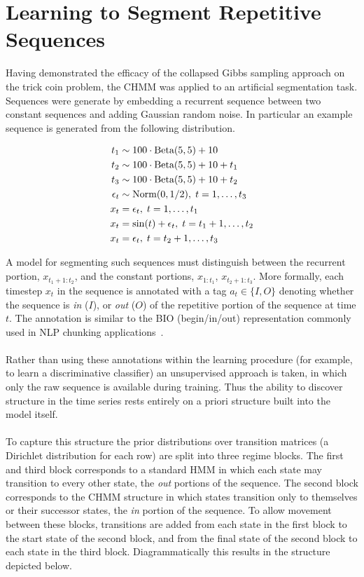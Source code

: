 \documentclass[12pt]{report}
\newcommand{\1}[0]{\mathbbm{1}}
\newcommand{\Beta}[0]{\textnormal{Beta}}
\newcommand{\Norm}[0]{\textnormal{Norm}}
\newcommand{\seq}[3]{\ensuremath{#1_{{#2}:{#3}}}}
\begin{document}
\section{Learning to Segment Repetitive Sequences}
\label{sec:Learning to Segment Repetitive Sequences}
Having demonstrated the efficacy of the collapsed Gibbs sampling approach
on the trick coin problem, the \ac{CHMM} was applied to an artificial
segmentation task.
Sequences were generate by embedding a recurrent sequence between two
constant sequences and adding Gaussian random noise.
In particular an example sequence is generated from the following distribution.

\begin{align*}
    t_1 & \sim 100 \cdot \Beta(5, 5) + 10 \\
    t_2 & \sim 100 \cdot \Beta(5, 5) + 10 + t_1 \\
    t_3 & \sim 100 \cdot \Beta(5, 5) + 10 + t_2 \\
    \epsilon_t & \sim \Norm(0, 1/2),\; t = 1,\ldots,t_3 \\
    x_t &= \epsilon_t,\; t=1,\ldots,t_1 \\
    x_t &= \sin(t) + \epsilon_t,\; t=t_1+1,\ldots,t_2 \\
    x_t &= \epsilon_t,\; t=t_2 + 1,\ldots,t_3\\
\end{align*}

A model for segmenting such sequences must distinguish between the recurrent portion,
$\seq{x}{t_1+1}{t_2}$, and the constant portions, $\seq{x}{1}{t_1}$, $\seq{x}{t_2+1}{t_3}$.
More formally, each timestep $x_t$ in the sequence is annotated with a tag $a_t \in \{I, O\}$
denoting whether the sequence is \emph{in} ($I$), or \emph{out} ($O$) of the repetitive portion
of the sequence at time $t$. The annotation is similar to the BIO (begin/in/out) representation
commonly used in \ac{NLP} chunking applications~\cite{ramshaw-bio}.
\\\\
Rather than using these annotations within the learning procedure (for example, to learn a
discriminative classifier) an unsupervised approach is taken, in which only the raw sequence
is available during training. Thus the ability to discover structure in the time series rests
entirely on a priori structure built into the model itself.
\\\\
To capture this structure the prior distributions over transition matrices
(a Dirichlet distribution for each row) are split into three regime blocks.
The first and third block corresponds to a standard \ac{HMM}
in which each state may transition to every other state, the \emph{out} portions of the sequence.
The second block corresponds to the \ac{CHMM} structure in which states transition
only to themselves or their successor states, the \emph{in} portion of the sequence.
To allow movement between these blocks, transitions are added from each state in the first block
to the start state of the second block, and from the final state of the second block to each state
in the third block. Diagrammatically this results in the structure depicted below.
\end{document}
